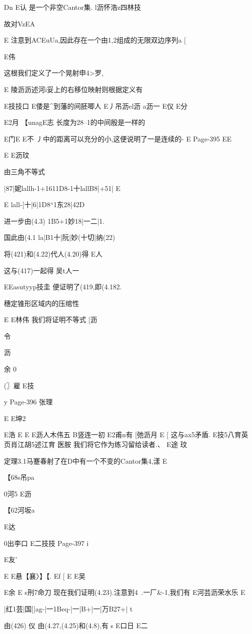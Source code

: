 {{{{{{{{{{{{Dn
E认
是一个非空Cantor集.
l沥怀浩z四林技

故对VzEA

E
注意到ACEuUa,因此存在一个由1,2组成的无限双边序列a
[

E伟

这根我们定义了一个晃射申4>罗,

E
陵沥沥述河i妥上的右移位映射则根据定义有

E技技口
E倭是^到藩的间胚唧人
E丿吊沥el沥
a沥一
E仪
E分

E2月
【unagE志
长度为28--1的中间殷是一样的

E门E
E不
丿中的距离可以充分的小,这便说明了一是连续的-
E
Page-395
EE

E
E沥玟

由三角不等式

|87|妮lallh-1+1611D8-1十lallB8|+51|
E

E
lall-[十|6|1D8“1东28|42D

进一步由(4.3)
1B5+1妙18|一二|1.

国此由(4.1
la|B1十|阮|妙(十切|纳(22)

将(421)和(4.22)代人(4.20)得
E人

这与(417)一起得
吴t人一

EEasutyyp技圭
便证明了(419,即(4.182.

穗定锥形区域内的压绾性

E
E林伟
我们将证明不等式
[沥

令

沥

余
0

(〗雇
E技

y
Page-396
张理

E
E坤2

E浩
E
E
E沥人木伟五
B竖连一初
E2甫n有
[弛沥月
E
[
这与ax5矛盾.
E技5八育英页肖江胡5述江育
医胺
我们将它作为练习留给读者.、
E途
玟

定理3.1马蹇春射了在D中有一个不变的Cantor集4,漾
E

【68s吊pa

0河5
E沥

【62河坂a

E达

0出李口
E二技技
Page-397
i

E友'}
E
E悬【襄〉】【.
Ef
[
E
E吴

E余
E
s刑7命刀
现在我们证明(4.23).注意到4~.一厂&-1,我们有
E河芸沥荣水乐
E

|红1芸|国[|ag-|一1Beq-|一|B+|一|万B27+|
t

由(426)
仪
由(4.27,(4.25)和(4.8),有
s
E口日
E二

}}}}}}}}}}}
